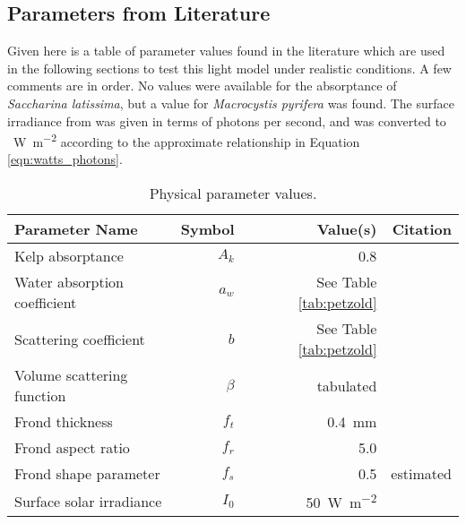\subsection{Parameters from Literature}
Given here is a table of parameter values found in the literature which are used in the following sections to test this light model under realistic conditions.
A few comments are in order.
No values were available for the absorptance of \textit{Saccharina latissima}, but a value for \textit{Macrocystis pyrifera} was found.
The surface irradiance from \cite{broch_modelling_2012} was given in terms of photons per second,
and was converted to \SI{}{\W\per\m\squared} according to the approximate relationship in Equation \eqref{eqn:watts_photons}.

\begin{table}[h]
  \centering
  \caption{Physical parameter values.}
  \begin{tabular}{lrrr}
    \toprule
    Parameter Name & Symbol & Value(s) & Citation \\ %
    \midrule
    Kelp absorptance & $A_k$ & 0.8 & \cite{colombo-pallotta_photosynthetic_2006} \\%
    Water absorption coefficient & $a_w$ & See Table \ref{tab:petzold} & \cite{petzold_volume_1972} \\%
    Scattering coefficient & $b$  & See Table \ref{tab:petzold} & \cite{petzold_volume_1972} \\%
    Volume scattering function & $\beta$ & tabulated & \cite{petzold_volume_1972,sokolov_parameterization_2010} \\%
    Frond thickness & $f_t$ & \SI{0.4}{\mm} & \cite{foldal_morphological_2018} \\
    Frond aspect ratio & $f_r$ & 5.0 & \cite{foldal_morphological_2018} \\
    Frond shape parameter & $f_s$ & 0.5 & estimated \\
    Surface solar irradiance & $I_0$ & \SI{50}{\W\per\m\squared} & \cite{broch_modelling_2012}  \\%
    \bottomrule
  \end{tabular}
  \label{tab:params}
\end{table}

